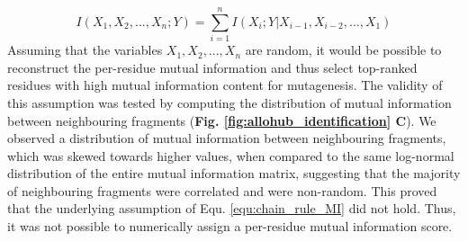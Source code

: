 %
%
\begin{equation}
I(X_{1}, X_{2}, ..., X_{n}; Y) = \sum_{i=1}^{n} I(X_{i}; Y | X_{i-1}, X_{i-2}, ..., X_{1}) 
\label{equ:chain_rule_MI}
\end{equation}
%
%
Assuming that the variables $X_{1}, X_{2}, ..., X_{n}$ are random, it would be possible to reconstruct the per-residue mutual information and thus select top-ranked residues with high mutual information content for mutagenesis. The validity of this assumption was tested by computing the distribution of mutual information between neighbouring fragments (\textbf{Fig. \ref{fig:allohub_identification} C}). We observed a distribution of mutual information between neighbouring fragments, which was skewed towards higher values, when compared to the same log-normal distribution of the entire mutual information matrix, suggesting that the majority of neighbouring fragments were correlated and were non-random. This proved that the underlying assumption of Equ. \ref{equ:chain_rule_MI} did not hold. Thus, it was not possible to numerically assign a per-residue mutual information score.
%
%
%
%
%
